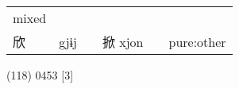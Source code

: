 \documentclass[14pt,a4paper]{scrartcl}
\begin{document}
\begin{longtable}[c]{@{}llllll@{}}
\begin{minipage}[t]{0.14\columnwidth}
mixed
\strut\end{minipage}\tabularnewline
\begin{minipage}[t]{0.14\columnwidth}\raggedright\strut
欣
\strut\end{minipage} &
\begin{minipage}[t]{0.14\columnwidth}\raggedright\strut
gjɨj
\strut\end{minipage} &
\begin{minipage}[t]{0.14\columnwidth}\raggedright\strut
\strut\end{minipage} &
\begin{minipage}[t]{0.14\columnwidth}\raggedright\strut
掀 xjon
\strut\end{minipage} &
\begin{minipage}[t]{0.14\columnwidth}\raggedright\strut
\strut\end{minipage} &
\begin{minipage}[t]{0.14\columnwidth}\raggedright\strut
pure:other
\strut\end{minipage}\tabularnewline
\bottomrule
\end{longtable}

(118) 0453 {[}3{]}
\end{document}

